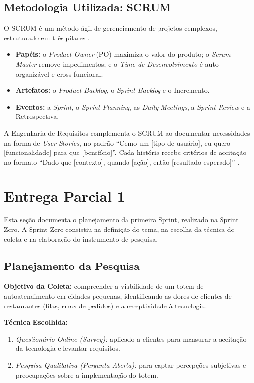 \documentclass[12pt, oneside, a4paper, chapter=TITLE,section=TITLE]{abntex2}
\begin{document}
\section{Metodologia Utilizada: SCRUM}

O SCRUM é um método ágil de gerenciamento de projetos complexos, estruturado em três pilares \cite{schwaber2017scrum}:

\begin{itemize}
    \item \textbf{Papéis:} o \textit{Product Owner} (PO) maximiza o valor do produto; o \textit{Scrum Master} remove impedimentos; e o \textit{Time de Desenvolvimento} é auto-organizável e cross-funcional.
    \item \textbf{Artefatos:} o \textit{Product Backlog}, o \textit{Sprint Backlog} e o Incremento.
    \item \textbf{Eventos:} a \textit{Sprint}, o \textit{Sprint Planning}, as \textit{Daily Meetings}, a \textit{Sprint Review} e a Retrospectiva.
\end{itemize}

A Engenharia de Requisitos complementa o SCRUM ao documentar necessidades na forma de \textit{User Stories}, no padrão ``Como um [tipo de usuário], eu quero [funcionalidade] para que [benefício]''. Cada história recebe critérios de aceitação no formato ``Dado que [contexto], quando [ação], então [resultado esperado]'' \cite{wazlawick2019engenharia}.

\chapter{Entrega Parcial 1}

Esta seção documenta o planejamento da primeira Sprint, realizado na Sprint Zero. A Sprint Zero consistiu na definição do tema, na escolha da técnica de coleta e na elaboração do instrumento de pesquisa.

\section{Planejamento da Pesquisa}

\textbf{Objetivo da Coleta:} compreender a viabilidade de um totem de autoatendimento em cidades pequenas, identificando as dores de clientes de restaurantes (filas, erros de pedidos) e a receptividade à tecnologia.

\textbf{Técnica Escolhida:}
\begin{enumerate}
    \item \textit{Questionário Online (Survey):} aplicado a clientes para mensurar a aceitação da tecnologia e levantar requisitos.
    \item \textit{Pesquisa Qualitativa (Pergunta Aberta):} para captar percepções subjetivas e preocupações sobre a implementação do totem.
\end{enumerate}
\end{document}
